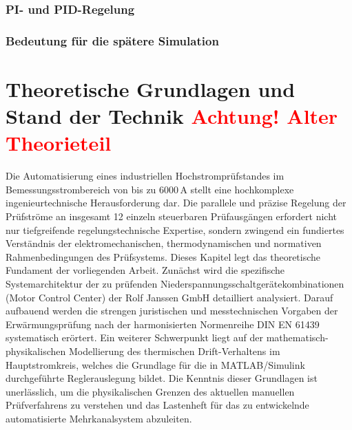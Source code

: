 \subsubsection{PI- und PID-Regelung}
\label{sec:pi_pid_regelung}


\subsubsection{Bedeutung für die spätere Simulation}
\label{sec:bedeutung_simulation}









    




\section{Theoretische Grundlagen und Stand der Technik
\textcolor{red}{\textbf{Achtung!  Alter Theorieteil}}}
\label{chap:grundlagen}

Die Automatisierung eines industriellen Hochstromprüfstandes im Bemessungsstrombereich von bis zu $6000\,\text{A}$ stellt eine hochkomplexe ingenieurtechnische Herausforderung dar. Die parallele und präzise Regelung der Prüfströme an insgesamt 12 einzeln steuerbaren Prüfausgängen erfordert nicht nur tiefgreifende regelungstechnische Expertise, sondern zwingend ein fundiertes Verständnis der elektromechanischen, thermodynamischen und normativen Rahmenbedingungen des Prüfsystems. 
Dieses Kapitel legt das theoretische Fundament der vorliegenden Arbeit. Zunächst wird die spezifische Systemarchitektur der zu prüfenden Niederspannungsschaltgerätekombinationen (Motor Control Center) der Rolf Janssen GmbH detailliert analysiert. Darauf aufbauend werden die strengen juristischen und messtechnischen Vorgaben der Erwärmungsprüfung nach der harmonisierten Normenreihe DIN EN 61439 systematisch erörtert. Ein weiterer Schwerpunkt liegt auf der mathematisch-physikalischen Modellierung des thermischen Drift-Verhaltens im Hauptstromkreis, welches die Grundlage für die in MATLAB/Simulink durchgeführte Reglerauslegung bildet. Die Kenntnis dieser Grundlagen ist unerlässlich, um die physikalischen Grenzen des aktuellen manuellen Prüfverfahrens zu verstehen und das Lastenheft für das zu entwickelnde automatisierte Mehrkanalsystem abzuleiten.


